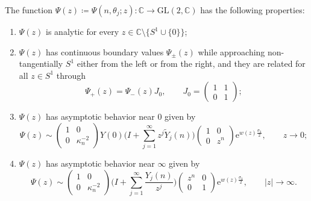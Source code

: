 \documentclass[pdftex]{sigma}%
\numberwithin{equation}{section}
\def\e{\mathrm{e}}
\begin{document}
\begin{problem}\label{RH2}
The function $\Psi(z)\coloneqq \Psi(n,\theta_j;z)\colon\mathbb{C} \rightarrow \mathrm{GL}(2,\mathbb{C})$ has the following properties:
\begin{enumerate}\itemsep=0pt
\item[(1)] $\Psi(z)$ is analytic for every $z \in \mathbb{C}\setminus \big\lbrace S^1\cup \lbrace 0 \rbrace \big\rbrace$;

\item[(2)] $\Psi(z)$ has continuous boundary values $ \Psi_{\pm}(z)$ while approaching non-tangentially $S^1$ either from the left or from the right, and they are related for all $z \in S^1$ through
\begin{equation}\label{eq:jump Psi}
\Psi_+ (z) =\Psi_-(z) J_{0}, \qquad
J_{0}=\begin{pmatrix}1 &1 \\0&1\end{pmatrix}\!;
\end{equation}

\item[(3)] $\Psi(z)$ has asymptotic behavior near $0$ given by
\begin{equation}\label{eq:Psi in 0}
\Psi(z) \sim \begin{pmatrix}1&0\\0& \kappa_{n}^{-2}\end{pmatrix}
Y(0)\Bigg(I+\sum_{j= 1}^\infty z^j\widetilde{Y}_j(n)\Bigg)
\begin{pmatrix}1&0\\0&z^n\end{pmatrix}\e^{w(z)\frac{\sigma_3}{2}},\qquad
z\rightarrow 0;
\end{equation}

\item[(4)] $\Psi(z)$ has asymptotic behavior near $\infty$ given by
\begin{equation}\label{eq: Psi in infy}
\Psi(z) \sim \begin{pmatrix}1&0\\0& \kappa_{n}^{-2}\end{pmatrix}
\Bigg(I+\sum_{j= 1}^\infty\frac{Y_j(n)}{z^j}\Bigg)
\begin{pmatrix}z^n&0\\0&1\end{pmatrix}\e^{w(z)\frac{\sigma_3}{2}},\qquad
\vert z \vert \rightarrow \infty.
\end{equation}
\end{enumerate}
\end{problem}
\end{document}
